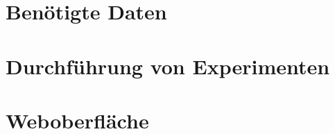 
\section{Benötigte Daten}
\blindtext

\section{Durchführung von Experimenten}
\blindtext

\section{Weboberfläche}
\blindtext
